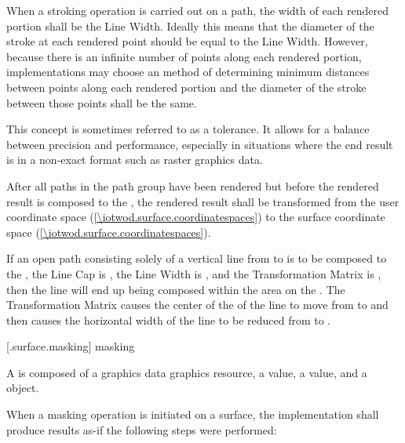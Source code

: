 \pnum
When a stroking operation is carried out on a path, the width of each rendered portion shall be the Line Width. Ideally this means that the diameter of the stroke at each rendered point should be equal to the Line Width. However, because there is an infinite number of points along each rendered portion, implementations may choose an \unspecnorm method of determining minimum distances between points along each rendered portion and the diameter of the stroke between those points shall be the same.
\begin{note}
This concept is sometimes referred to as a tolerance. It allows for a balance between precision and performance, especially in situations where the end result is in a non-exact format such as raster graphics data.
\end{note}

\pnum
After all paths in the path group have been rendered but before the rendered result is composed to the \underlyingsurface, the rendered result shall be transformed from the user coordinate space (\ref{\iotwod.surface.coordinatespaces}) to the surface coordinate space (\ref{\iotwod.surface.coordinatespaces}).
\begin{example}
If an open path consisting solely of a vertical line from  to  is to be composed to the \underlyingsurface, the Line Cap is , the Line Width is , and the Transformation Matrix is , then the line will end up being composed within the area  on the \underlyingsurface. The Transformation Matrix causes the center of the \xaxis of the line to move from  to  and then causes the horizontal width of the line to be reduced from  to .
\end{example}

 [\iotwod.surface.masking] { masking}

\pnum
A  is composed of a graphics data graphics resource, a  value, a  value, and a  object.

\pnum
When a masking operation is initiated on a surface, the implementation shall produce results as-if the following steps were performed:

